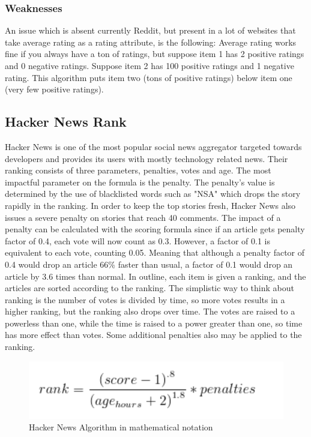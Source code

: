 \subsubsection {Weaknesses}
An issue which is absent currently Reddit, but present in a lot of websites that take average rating as a rating attribute, is the following: Average rating works fine if you always have a ton of ratings, but suppose item 1 has 2 positive ratings and 0 negative ratings. Suppose item 2 has 100 positive ratings and 1 negative rating. This algorithm puts item two (tons of positive ratings) below item one (very few positive ratings).


\subsection{Hacker News Rank}
Hacker News is one of the most popular social news aggregator targeted towards developers and provides its users with mostly technology related news. Their ranking consists of three parameters, penalties, votes and age. The most impactful parameter on the formula is the penalty. The penalty's value is determined by the use of blacklisted words such as "NSA" which drops the story rapidly in the ranking. In order to keep the top stories fresh, Hacker News also issues a severe penalty on stories that reach 40 comments. The impact of a penalty can be calculated with the scoring formula since if an article gets penalty factor of 0.4, each vote will now count as 0.3. However, a factor of 0.1 is equivalent to each vote, counting 0.05. Meaning that although a penalty factor of 0.4 would drop an article 66\% faster than usual, a factor of  0.1 would drop an article by 3.6 times than normal. In outline, each item is given a ranking, and the articles are sorted according to the ranking. The simplistic way to think about ranking is the number of votes is divided by time, so more votes results in a higher ranking, but the ranking also drops over time. The votes are raised to a powerless than one, while the time is raised to a power greater than one, so time has more effect than votes. Some additional penalties also may be applied to the ranking.

\begin{figure} [htbp]
  \centering
	\includegraphics{Figures/hacker_news_rank}
\caption{Hacker News Algorithm in mathematical notation}
\end{figure}

